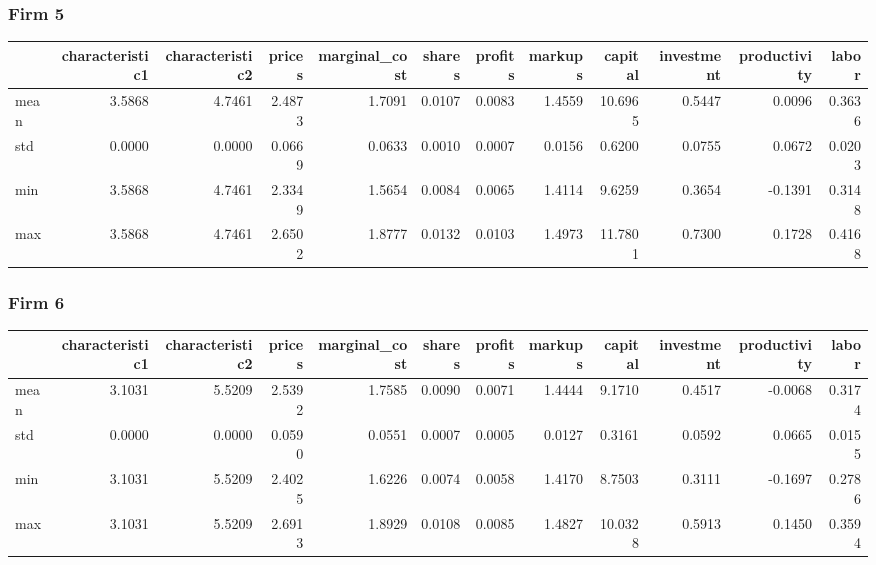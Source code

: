  \subsubsection*{Firm 5}
\begin{tabular}{lrrrrrrrrrrr}
\toprule
{} &  characteristic1 &  characteristic2 &  prices &  marginal\_cost &  shares &  profits &  markups &  capital &  investment &  productivity &  labor \\
\midrule
mean &           3.5868 &           4.7461 &  2.4873 &         1.7091 &  0.0107 &   0.0083 &   1.4559 &  10.6965 &      0.5447 &        0.0096 & 0.3636 \\
std  &           0.0000 &           0.0000 &  0.0669 &         0.0633 &  0.0010 &   0.0007 &   0.0156 &   0.6200 &      0.0755 &        0.0672 & 0.0203 \\
min  &           3.5868 &           4.7461 &  2.3349 &         1.5654 &  0.0084 &   0.0065 &   1.4114 &   9.6259 &      0.3654 &       -0.1391 & 0.3148 \\
max  &           3.5868 &           4.7461 &  2.6502 &         1.8777 &  0.0132 &   0.0103 &   1.4973 &  11.7801 &      0.7300 &        0.1728 & 0.4168 \\
\bottomrule
\end{tabular}


 \subsubsection*{Firm 6}
\begin{tabular}{lrrrrrrrrrrr}
\toprule
{} &  characteristic1 &  characteristic2 &  prices &  marginal\_cost &  shares &  profits &  markups &  capital &  investment &  productivity &  labor \\
\midrule
mean &           3.1031 &           5.5209 &  2.5392 &         1.7585 &  0.0090 &   0.0071 &   1.4444 &   9.1710 &      0.4517 &       -0.0068 & 0.3174 \\
std  &           0.0000 &           0.0000 &  0.0590 &         0.0551 &  0.0007 &   0.0005 &   0.0127 &   0.3161 &      0.0592 &        0.0665 & 0.0155 \\
min  &           3.1031 &           5.5209 &  2.4025 &         1.6226 &  0.0074 &   0.0058 &   1.4170 &   8.7503 &      0.3111 &       -0.1697 & 0.2786 \\
max  &           3.1031 &           5.5209 &  2.6913 &         1.8929 &  0.0108 &   0.0085 &   1.4827 &  10.0328 &      0.5913 &        0.1450 & 0.3594 \\
\bottomrule
\end{tabular}


